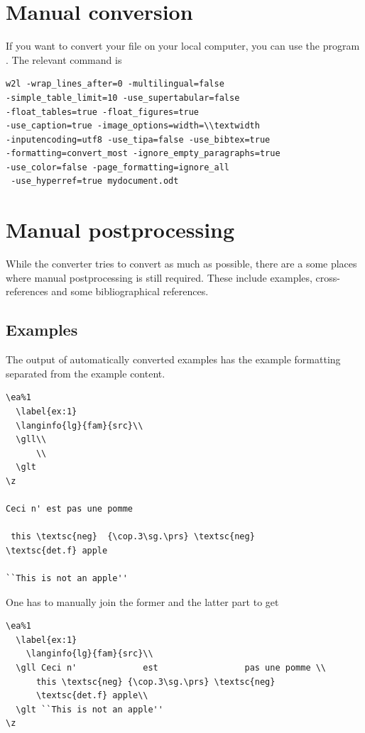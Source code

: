 \section{Manual conversion}
If you want to convert your file on your local computer, you can use the program . The relevant command is 
\begin{verbatim}
w2l -wrap_lines_after=0 -multilingual=false 
-simple_table_limit=10 -use_supertabular=false 
-float_tables=true -float_figures=true 
-use_caption=true -image_options=width=\\textwidth 
-inputencoding=utf8 -use_tipa=false -use_bibtex=true  
-formatting=convert_most -ignore_empty_paragraphs=true 
-use_color=false -page_formatting=ignore_all
 -use_hyperref=true mydocument.odt
\end{verbatim}

\section{Manual postprocessing}
While the converter tries to convert as much as possible, there are a some places where manual postprocessing is still required.
These include examples, cross-references and some bibliographical references.

\subsection{Examples}
The output of automatically converted examples has the example formatting separated from the example content.  
\begin{verbatim}
\ea%1
  \label{ex:1}
  \langinfo{lg}{fam}{src}\\
  \gll\\
      \\
  \glt
\z

Ceci n' est pas une pomme

 this \textsc{neg}  {\cop.3\sg.\prs} \textsc{neg}   
\textsc{det.f} apple

``This is not an apple''
\end{verbatim}

One has to manually join the former and the latter part to get

\begin{verbatim}
\ea%1
  \label{ex:1}
    \langinfo{lg}{fam}{src}\\
  \gll Ceci n'             est                 pas une pomme \\
      this \textsc{neg} {\cop.3\sg.\prs} \textsc{neg}   
      \textsc{det.f} apple\\
  \glt ``This is not an apple''
\z 
\end{verbatim} 

